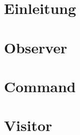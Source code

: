 \documentclass[a4paper,11pt]{scrreprt}
\begin{document}


\tableofcontents %

\chapter{Einleitung}

\chapter{Observer}






\chapter{Command}






\chapter{Visitor}










\end{document}
